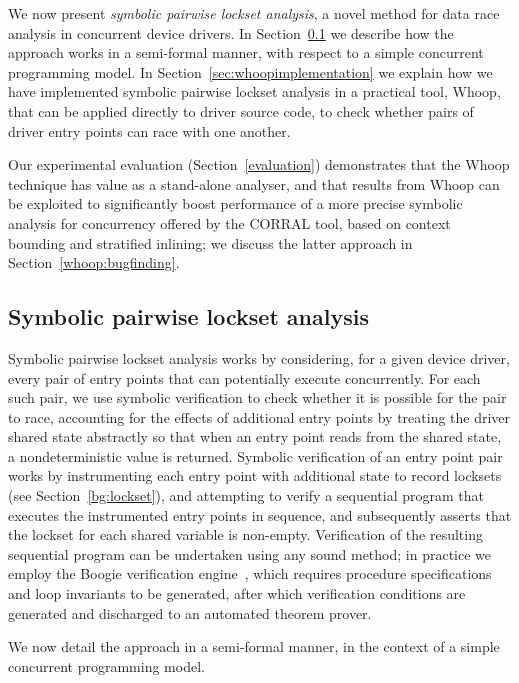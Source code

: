 
We now present \emph{symbolic pairwise lockset analysis}, a novel method
for data race analysis in concurrent device drivers.  In
Section~\ref{sec:symbolicpairwise} we describe how the approach works
in a semi-formal manner, with respect to a simple concurrent
programming model.  In Section~\ref{sec:whoopimplementation} we
explain how we have implemented symbolic pairwise lockset analysis in
a practical tool, Whoop, that can be applied directly to driver source
code, to check whether pairs of driver entry points can race with one
another.

Our experimental evaluation (Section~\ref{evaluation}) demonstrates that the Whoop technique has value as a stand-alone analyser, and that results from Whoop can be exploited to significantly boost performance of a more precise symbolic analysis for concurrency offered by the CORRAL tool, based on context bounding and stratified inlining; we discuss the latter approach in Section~\ref{whoop:bugfinding}.

\subsection{Symbolic pairwise lockset analysis}\label{sec:symbolicpairwise}

Symbolic pairwise lockset analysis works by considering, for a given device driver, every pair of entry points that can potentially execute concurrently.  For each such pair, we use symbolic verification to check whether it is possible for the pair to race, accounting for the effects of additional entry points by treating the driver shared state abstractly so that when an entry point reads from the shared state, a nondeterministic value is returned.  Symbolic verification of an entry point pair works by instrumenting each entry point with additional state to record locksets (see Section~\ref{bg:lockset}), and attempting to verify a sequential program that executes the instrumented entry points in sequence, and subsequently asserts that the lockset for each shared variable is non-empty.  Verification of the resulting sequential program can be undertaken using any sound method; in practice we employ the Boogie verification engine~\cite{barnett2006boogie}, which requires procedure specifications and loop invariants to be generated, after which verification conditions are generated and discharged to an automated theorem prover.

We now detail the approach in a semi-formal manner, in the context of a simple concurrent programming model.

